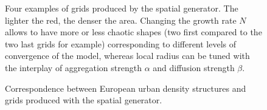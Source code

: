 \documentclass[Afour,sageh,times]{sagej}
\begin{document}
\begin{figure}[htbp] \begin{center} 
 \caption{Four examples of grids produced by the spatial generator. The lighter the red, the denser the area. Changing the growth rate $N$ allows to have more or less chaotic shapes (two first compared to the two last grids for example) corresponding to different levels of convergence of the model, whereas local radius can be tuned with the interplay of aggregation strength $\alpha$ and diffusion strength $\beta$.} \label{fig:spatialGen} \end{center} \end{figure} %

\begin{figure}[htbp] \begin{center} 
 \caption{Correspondence between European urban density structures and grids produced with the spatial generator.} 
\label{fig:densityTypes} \end{center} \end{figure} %
\end{document}
